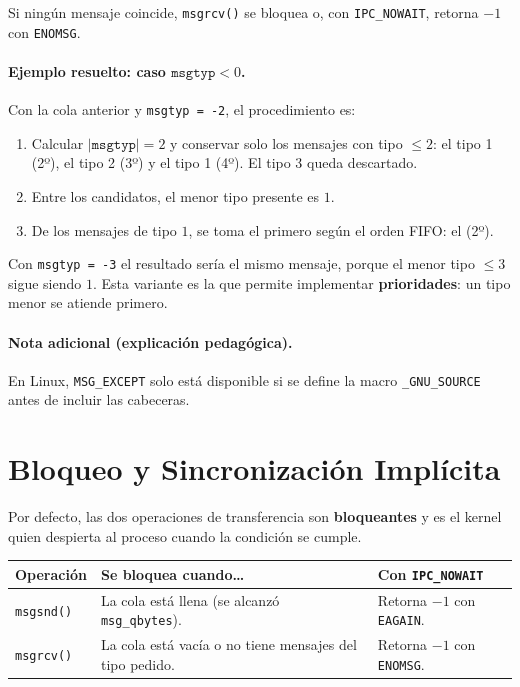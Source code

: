 \documentclass[12pt,a4paper]{article}
\begin{document}
Si ningún mensaje coincide, \texttt{msgrcv()} se bloquea o, con \texttt{IPC\_NOWAIT}, retorna $-1$ con \texttt{ENOMSG}.

\paragraph{Ejemplo resuelto: caso $\texttt{msgtyp} < 0$.} Con la cola anterior y \texttt{msgtyp = -2}, el procedimiento es:
\begin{enumerate}
    \item Calcular $|\texttt{msgtyp}| = 2$ y conservar solo los mensajes con tipo $\leq 2$: el tipo 1 (2º), el tipo 2 (3º) y el tipo 1 (4º). El tipo 3 queda descartado.
    \item Entre los candidatos, el menor tipo presente es $1$.
    \item De los mensajes de tipo $1$, se toma el primero según el orden FIFO: el (2º).
\end{enumerate}
Con \texttt{msgtyp = -3} el resultado sería el mismo mensaje, porque el menor tipo $\leq 3$ sigue siendo $1$. Esta variante es la que permite implementar \textbf{prioridades}: un tipo menor se atiende primero.

\paragraph{Nota adicional (explicación pedagógica).} En Linux, \texttt{MSG\_EXCEPT} solo está disponible si se define la macro \texttt{\_GNU\_SOURCE} antes de incluir las cabeceras.

\section{Bloqueo y Sincronización Implícita}
Por defecto, las dos operaciones de transferencia son \textbf{bloqueantes} y es el kernel quien despierta al proceso cuando la condición se cumple.

\begin{table}[h]
\centering
\small
\begin{tabular}{|p{3.1cm}|p{4.6cm}|p{4.7cm}|}
\hline
\textbf{Operación} & \textbf{Se bloquea cuando\ldots} & \textbf{Con \texttt{IPC\_NOWAIT}} \\ \hline
\texttt{msgsnd()} & La cola está llena (se alcanzó \texttt{msg\_qbytes}). & Retorna $-1$ con \texttt{EAGAIN}. \\ \hline
\texttt{msgrcv()} & La cola está vacía o no tiene mensajes del tipo pedido. & Retorna $-1$ con \texttt{ENOMSG}. \\ \hline
\end{tabular}
\end{table}
\end{document}
